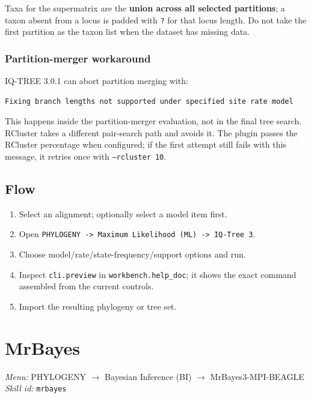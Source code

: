\documentclass[11pt]{report}
\begin{document}
Taxa for the supermatrix are the \textbf{union across all selected partitions}; a taxon absent from a locus is padded with \texttt{?} for that locus length. Do not take the first partition as the taxon list when the dataset has missing data.

\subsubsection{Partition-merger workaround}

IQ-TREE 3.0.1 can abort partition merging with:

\begin{lstlisting}
Fixing branch lengths not supported under specified site rate model
\end{lstlisting}

This happens inside the partition-merger evaluation, not in the final tree search. RCluster takes a different pair-search path and avoids it. The plugin passes the RCluster percentage when configured; if the first attempt still fails with this message, it retries once with \texttt{--rcluster 10}.

\subsection{Flow}

\begin{enumerate}
  \item Select an alignment; optionally select a model item first.
  \item Open \texttt{PHYLOGENY -> Maximum Likelihood \allowbreak (ML) -> IQ-Tree 3}.
  \item Choose model/rate/state-frequency/support options and run.
  \item Inspect \texttt{cli.\allowbreak preview} in \texttt{workbench.\allowbreak help\_\allowbreak doc}; it shows the exact command assembled from the current controls.
  \item Import the resulting phylogeny or tree set.
\end{enumerate}


\section{MrBayes}
\noindent\textit{Menu:} PHYLOGENY $\rightarrow$ Bayesian Inference (BI) $\rightarrow$ MrBayes3-MPI-BEAGLE\\
\noindent\textit{Skill id:} \texttt{mrbayes}
\end{document}
